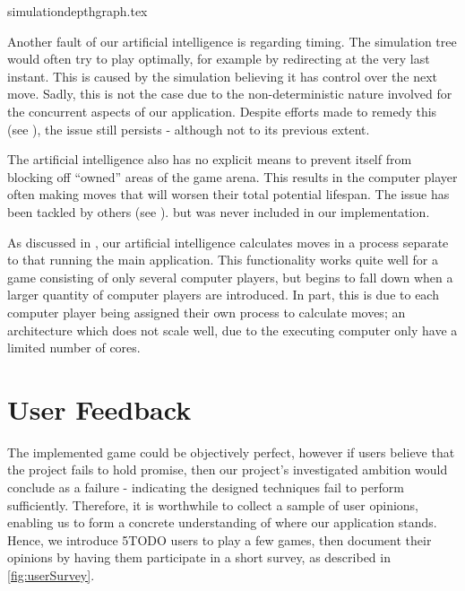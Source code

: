 \documentclass{standalone}
\begin{document}
		{simulationdepthgraph.tex}
		\FloatBarrier

		Another fault of our artificial intelligence is regarding timing. The simulation tree would often try to play optimally, for example by redirecting at the very last instant. This is caused by the simulation believing it has control over the next move. Sadly, this is not the case due to the non-deterministic nature involved for the concurrent aspects of our application. Despite efforts made to remedy this (see ), the issue still persists - although not to its previous extent.

		The artificial intelligence also has no explicit means to prevent itself from blocking off \enquote{owned} areas of the game arena. This results in the computer player often making moves that will worsen their total potential lifespan. The issue has been tackled by others (see ). but was never included in our implementation.

		As discussed in , our artificial intelligence calculates moves in a process separate to that running the main application. This functionality works quite well for a game consisting of only several computer players, but begins to fall down when a larger quantity of computer players are introduced. In part, this is due to each computer player being assigned their own process to calculate moves; an architecture which does not scale well, due to the executing computer only have a limited number of cores.

	\section{User Feedback} \label{sec:userFeedback}
		The implemented game could be objectively perfect, however if users believe that the project fails to hold promise, then our project's investigated ambition would conclude as a failure - indicating the designed techniques fail to perform sufficiently. Therefore, it is worthwhile to collect a sample of user opinions, enabling us to form a concrete understanding of where our application stands. Hence, we introduce 5TODO users to play a few games, then document their opinions by having them participate in a short survey, as described in \autoref{fig:userSurvey}.
\end{document}
